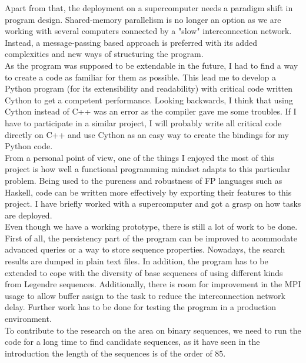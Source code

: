 \documentclass{tfg_domingo}
\begin{document}
  Apart from that, the deployment on a
  supercomputer needs a paradigm shift in program design. Shared-memory
  parallelism is no longer an option as we are working with several computers
  connected by a "slow" interconnection network. Instead, a message-passing
  based approach is preferred with its added complexities and new ways of
  structuring the program.\\

  As the program was supposed to be extendable in the future, I had to
  find a way to create a code as familiar for them as possible. This lead me to
  develop a Python program (for its extensibility and readability) with
  critical code written Cython to get a competent performance. Looking
  backwards, I think that using Cython instead of C++ was an error as the
  compiler gave me some troubles. If I have to participate in a similar project,
  I will probably write all critical code directly on C++ and use Cython as
  an easy way to create the bindings for my Python code.\\

 From a personal point of view,  one of the things I enjoyed the most of this
 project is how well a functional programming mindset adapts to this particular
 problem. Being used to the pureness and robustness of FP languages such as Haskell,
  code can be written more effectively by exporting their features to this
  project.  I have briefly worked with a supercomputer and got a grasp
  on how tasks are deployed.\\

 Even though we have a working prototype, there is still a lot of work to be done.
First of all, the persistency part of the program can be improved to acommodate
advanced queries or a way to store sequence properties. Nowadays, the search
results are dumped in plain text files. In addition, the program has to be extended
to cope with the diversity of base sequences of using different kinds from Legendre
sequences. Additionally, there is room for improvement in the MPI usage to allow
buffer assign to the task  to reduce the interconnection network delay.  Further
work has to be done for testing the program in a production environment.\\

To contribute to the research on the area on binary sequences, we need to run the
code for a long time to find candidate sequences, as it have seen in the introduction
the length of the sequences is of the order of $85$.\\
\end{document}
